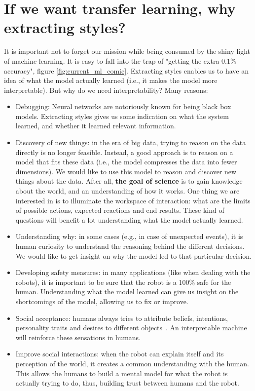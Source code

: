 \section{If we want transfer learning, why extracting styles?}
  \par It is important not to forget our mission while being consumed by the shiny light of machine learning. It is easy to fall into the trap of "getting the extra 0.1\% accuracy", figure \ref{fig:current_ml_comic}. Extracting styles enables us to have an idea of what the model actually learned (i.e., it makes the model more interpretable). But why do we need interpretability? Many reasons:
  \begin{itemize}
    \item Debugging: Neural networks are notoriously known for being black box models. Extracting styles gives us some indication on what the system learned, and whether it learned relevant information.

    \item Discovery of new things: in the era of big data, trying to reason on the data directly is no longer feasible. Instead, a good approach is to reason on a model that fits these data (i.e., the model compresses the data into fewer dimensions). We would like to use this model to reason and discover new things about the data. After all, \textbf{the goal of science} is to gain knowledge about the world, and an understanding of how it works. One thing we are interested in is to illuminate the workspace of interaction: what are the limits of possible actions, expected reactions and end results. These kind of questions will benefit a lot understanding what the model actually learned.

    \item Understanding why: in some cases (e.g., in case of unexpected events), it is human curiosity to understand the reasoning behind the different decisions. We would like to get insight on why the model led to that particular decision.

    \item Developing safety measures: in many applications (like when dealing with the robots), it is important to be sure that the robot is a 100\% safe for the human. Understanding what the model learned can give us insight on the shortcomings of the model, allowing us to fix or improve.

    \item Social acceptance: humans always tries to attribute beliefs, intentions, personality traits and desires to different objects~\citep{heider1944experimental}. An interpretable machine will reinforce these sensations in humans.

    \item Improve social interactions: when the robot can explain itself and its perception of the world, it creates a common understanding with the human. This allows the humans to build a mental model for what the robot is actually trying to do, thus, building trust between humans and the robot.
  \end{itemize}

